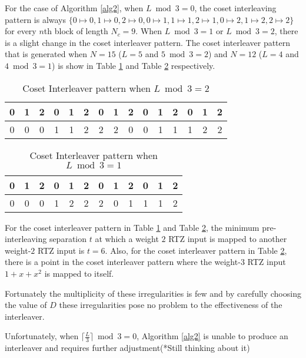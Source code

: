 \documentclass[11pt, oneside, dvipdfmx]{book}
\begin{document}
For the case of Algorithm \ref{alg2},
when $L \bmod 3 =0$, the coset interleaving pattern is always $\{0 \mapsto 0, 1 \mapsto 0, 2 \mapsto 0, 0 \mapsto 1, 1 \mapsto 1, 2 \mapsto 1, 0 \mapsto 2, 1 \mapsto 2, 2 \mapsto 2 \}$ for every $n$th block of length $N_c=9$. When $L \bmod 3 =1$ or $L \bmod 3 =2$, there is a slight change in the coset interleaver pattern. The coset interleaver pattern that is generated when $N=15$ ($L=5$ and $5 \bmod 3 =2$) and $N=12$ ($L=4$ and $4 \bmod 3 =1$) is show in Table \ref{tb4} and Table \ref{tb5} respectively.
\begin{table}[h!]
\centering
\begin{tabular}{|c | c  |c  |c  |c  |c  |c  |c  |c  |c  |c  |c  |c  |c  |c |} 
 \hline
 0 & 1 & 2 &  0 & 1 & 2 &  0 & 1 & 2 &  0 & 1 & 2 &  0 & 1 & 2 \\ 
  \hline
 0 & 0 & 0 &  1 & 1 & 2 &  2 & 2 & 0 &  0 & 1 & 1 &  1 & 2 & 2 \\ 
 \hline
\end{tabular}
\caption{Coset Interleaver pattern when $L \bmod 3 =2$}
\label{tb4}
\end{table}


\begin{table}[h!]
\centering
\begin{tabular}{|c | c  |c  |c  |c  |c  |c  |c  |c  |c  |c  |c  |} 
 \hline
 0 & 1 & 2 &  0 & 1 & 2 &  0 & 1 & 2 &  0 & 1 & 2\\ 
  \hline
 0 & 0 & 0 &  1 & 2 & 2 &  2 & 0 & 1 &  1 & 1 & 2 \\ 
 \hline
\end{tabular}
\caption{Coset Interleaver pattern when $L \bmod 3 =1$}
\label{tb5}
\end{table}
For the coset interleaver pattern in Table \ref{tb4} and Table \ref{tb5}, the minimum pre-interleaving separation $t$ at which a weight $2$ RTZ input is mapped to another weight-$2$ RTZ input is $t=6$.
Also, for the coset interleaver pattern in Table \ref{tb5}, there is a point in the coset interleaver pattern where the weight-$3$ RTZ input  $1+x+x^2$ is mapped to itself.

Fortunately the multiplicity of these irregularities is few and by carefully choosing the value of $D$ these irregularities pose no problem to the effectiveness of the interleaver.

Unfortunately, when $\lceil \frac{L}{3}  \rceil \bmod 3 =0$, Algorithm \ref{alg2} is unable to produce an interleaver and requires further adjustment(*Still thinking about it)
\end{document}

